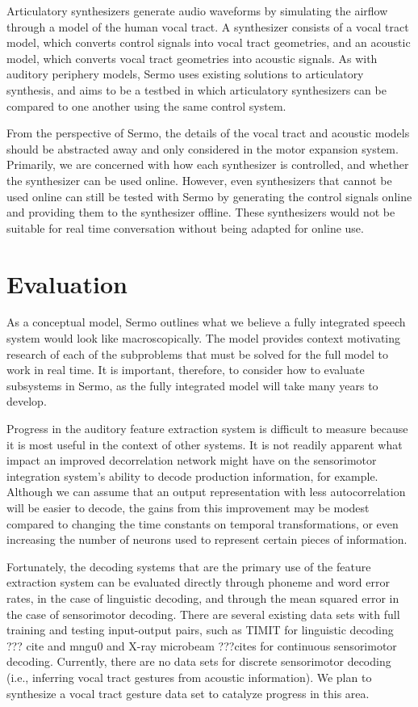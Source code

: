 Articulatory synthesizers
generate audio waveforms
by simulating the airflow
through a model of the human vocal tract.
A synthesizer consists of a vocal tract model,
which converts control signals
into vocal tract geometries,
and an acoustic model,
which converts vocal tract geometries
into acoustic signals.
As with auditory periphery models,
Sermo uses existing solutions
to articulatory synthesis,
and aims to be a testbed
in which articulatory synthesizers
can be compared to one another
using the same control system.

From the perspective of Sermo,
the details of the vocal tract
and acoustic models
should be abstracted away
and only considered
in the motor expansion system.
Primarily, we are concerned with
how each synthesizer is controlled,
and whether the synthesizer
can be used online.
However, even synthesizers
that cannot be used online
can still be tested with Sermo
by generating the control signals online
and providing them to the synthesizer offline.
These synthesizers would not be suitable
for real time conversation without
being adapted for online use.

\section{Evaluation}

As a conceptual model,
Sermo outlines what we believe a fully integrated
speech system would look like macroscopically.
The model provides context
motivating research of each
of the subproblems that must be solved
for the full model to work in real time.
It is important, therefore,
to consider how to evaluate
subsystems in Sermo,
as the fully integrated model
will take many years to develop.

Progress in the auditory feature extraction system
is difficult to measure
because it is most useful
in the context of other systems.
It is not readily apparent
what impact
an improved decorrelation network
might have on the sensorimotor integration
system's ability to decode production information,
for example.
Although we can assume that
an output representation with
less autocorrelation
will be easier to decode,
the gains from this improvement
may be modest compared to
changing the time constants on temporal transformations,
or even increasing the number of neurons
used to represent certain pieces of information.

Fortunately, the decoding systems
that are the primary use
of the feature extraction system
can be evaluated directly
through phoneme and word error rates,
in the case of linguistic decoding,
and through the mean squared error
in the case of sensorimotor decoding.
There are several existing data sets
with full training and testing
input-output pairs,
such as TIMIT for linguistic decoding
??? cite and
mngu0 and X-ray microbeam ???cites
for continuous sensorimotor decoding.
Currently, there are no data sets
for discrete sensorimotor decoding
(i.e., inferring vocal tract gestures
from acoustic information).
We plan to synthesize a
vocal tract gesture
data set to catalyze progress
in this area.

